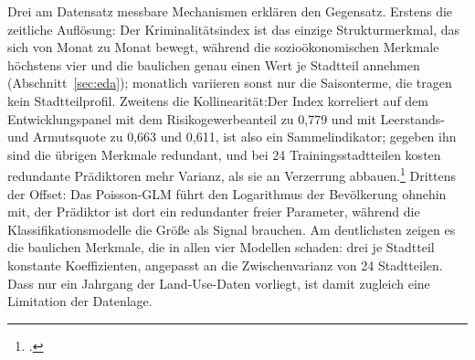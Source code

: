\documentclass[12pt,a4paper]{article}
\begin{document}
Drei am Datensatz messbare Mechanismen erklären den Gegensatz. Erstens die zeitliche Auflösung: Der Kriminalitätsindex ist das einzige Strukturmerkmal, das sich von Monat zu Monat bewegt, während die sozioökonomischen Merkmale höchstens vier und die baulichen genau einen Wert je Stadtteil annehmen (Abschnitt~\ref{sec:eda}); monatlich variieren sonst nur die Saisonterme, die tragen kein Stadtteilprofil. Zweitens die Kollinearität:Der Index korreliert auf dem Entwicklungspanel mit dem Risikogewerbeanteil zu 0,779 und mit Leerstands- und Armutsquote zu 0,663 und 0,611, ist also ein Sammelindikator; gegeben ihn sind die übrigen Merkmale redundant, und bei 24 Trainingsstadtteilen kosten redundante Prädiktoren mehr Varianz, als sie an Verzerrung abbauen.\footcite[38]{Hastie2009} Drittens der Offset: Das Poisson-GLM führt den Logarithmus der Bevölkerung ohnehin mit, der Prädiktor ist dort ein redundanter freier Parameter, während die Klassifikationsmodelle die Größe als Signal brauchen. Am deutlichsten zeigen es die baulichen Merkmale, die in allen vier Modellen schaden: drei je Stadtteil konstante Koeffizienten, angepasst an die Zwischenvarianz von 24 Stadtteilen. Dass nur ein Jahrgang der Land-Use-Daten vorliegt, ist damit zugleich eine Limitation der Datenlage.
 
\end{document}
